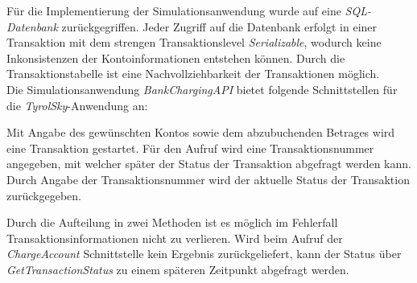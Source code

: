 Für die Implementierung der Simulationsanwendung wurde auf eine \textit{SQL-Datenbank} zurückgegriffen. Jeder Zugriff auf die Datenbank erfolgt in einer Transaktion mit dem strengen Transaktionslevel \textit{Serializable}, wodurch keine Inkonsistenzen der Kontoinformationen entstehen können. Durch die Transaktionstabelle ist eine Nachvollziehbarkeit der Transaktionen möglich. \\
Die Simulationsanwendung \textit{BankChargingAPI} bietet folgende Schnittstellen für die \textit{TyrolSky}-Anwendung an:
\begin{itemize}
        Mit Angabe des gewünschten Kontos sowie dem abzubuchenden Betrages wird eine Transaktion gestartet. Für den Aufruf wird eine Transaktionsnummer angegeben, mit welcher später der Status der Transaktion abgefragt werden kann.
        Durch Angabe der Transaktionsnummer wird der aktuelle Status der Transaktion zurückgegeben. 
\end{itemize}
Durch die Aufteilung in zwei Methoden ist es möglich im Fehlerfall Transaktionsinformationen nicht zu verlieren. Wird beim Aufruf der \textit{ChargeAccount} Schnittstelle kein Ergebnis zurückgeliefert, kann der Status über \textit{GetTransactionStatus} zu einem späteren Zeitpunkt abgefragt werden.

